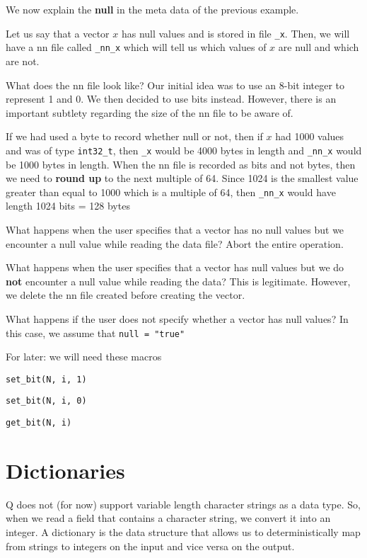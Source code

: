 \documentclass[letterpaper]{article}
\begin{document}
We now explain the {\bf null} in the meta data of the previous example. 

Let us say that a vector \(x\) has null values and is stored in file
\verb+_x+.  Then, we will have a nn file called \verb+_nn_x+ which
will tell us which values of \(x\) are null and which are not.

What does the nn file look like? Our initial idea was to use an 8-bit
integer to represent 1 and 0. We then decided to use bits
instead. However, there is an important subtlety regarding the size of
the nn file to be aware of.

If we had used a byte to record whether null or not, then if \(x\) had
1000 values and was of type \verb+int32_t+, then \verb+_x+ would be
4000 bytes in length and \verb+_nn_x+ would be 1000 bytes in
length. When the nn file is recorded as bits and not bytes, then we need to
{\bf round up} to the next multiple of 64. Since 1024 is the smallest
value greater than equal to 1000 which is a multiple of 64, then
\verb+_nn_x+ would have length 1024 bits = 128 bytes

What happens when the user specifies that a vector 
has no null values but we encounter a null value while reading the data
file? Abort the entire operation.

What happens when the user specifies that a vector 
has null values but we do {\bf not} encounter a null value while reading the
data? This is legitimate. However, we delete the nn file created before creating
the vector.

What happens if the user does not specify whether a vector has null values? In
this case, we assume that \verb+null = "true"+

For later: we will need these macros
\be 
\item \verb+set_bit(N, i, 1)+
\item \verb+set_bit(N, i, 0)+
\item \verb+get_bit(N, i)+
\ee


\section{Dictionaries}
\label{dictionary}

Q does not (for now) support variable length character strings as a
data type.  So, when we read a field that contains a character string,
we convert it into an integer. A dictionary is the data structure that allows us
to deterministically map from strings to integers on the input and vice versa on
the output.
\end{document}
